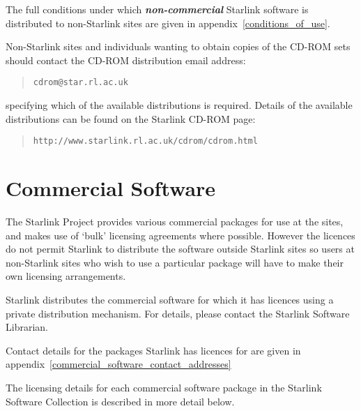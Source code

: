 \documentclass[twoside,11pt]{article}
\newcommand{\htmladdnormallink}[2]{#1}
\newcommand{\htmlref}[2]{#1}
\newcommand{\latexhtml}[2]{#1}
\newcommand{\xlabel}[1]{}
\renewcommand{\_}{\texttt{\symbol{95}}}
\begin{document}
The full conditions under which \textbf{\textit{non-commercial\/}}
Starlink software is distributed to non-Starlink sites are given in
\latexhtml{appendix~\ref{conditions_of_use}.}{the \htmlref{Conditions
of Use}{conditions_of_use} section.}

Non-Starlink sites and individuals wanting to obtain copies of the CD-ROM
sets should contact the CD-ROM distribution email address:

\begin{quote}
\htmladdnormallink{\texttt{cdrom@star.rl.ac.uk}}{mailto:cdrom@star.rl.ac.uk}
\end{quote}

specifying which of the available distributions is required.  Details
of the available distributions can be found on the Starlink CD-ROM
page:

\begin{quote}
\htmladdnormallink{\texttt{http://www.starlink.rl.ac.uk/cdrom/cdrom.html}}{http://www.starlink.rl.ac.uk/cdrom/cdrom.html}
\end{quote}

\section{\xlabel{commercial_software}Commercial Software}
\label{commercial_software}

The Starlink Project provides various commercial packages for use at the
sites, and makes use of `bulk' licensing agreements where possible.
However the licences do not permit Starlink to distribute the software 
outside Starlink sites so users at non-Starlink sites who wish to use a
particular package will have to make their own licensing arrangements.

Starlink distributes the commercial software for which it has licences 
using a private distribution mechanism.  For details, please contact the 
Starlink Software Librarian.

Contact details for the packages Starlink has licences for are given in 
\latexhtml{appendix~\ref{commercial_software_contact_addresses}}{the 
\htmlref{Commercial software contact addresses}{commercial_software_contact_addresses} 
section.}

The licensing details for each commercial software package in the Starlink
Software Collection is described in more detail below.
\end{document}
